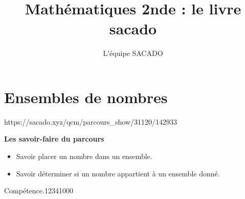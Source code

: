 



\title{Mathématiques 2nde  : le livre sacado}
\author{L'équipe SACADO}




\chapter{Ensembles de nombres}
{https://sacado.xyz/qcm/parcours_show/31120/142933}
{
 \begin{CpsCol}
	\textbf{Les savoir-faire du parcours}
 	\begin{itemize}
 		\item Savoir placer un nombre dans un ensemble.
		\item Savoir déterminer si un nombre appartient à un ensemble donné.
 	\end{itemize}
 \end{CpsCol}

\begin{His}
\end{His}

\begin{ExoDec}{Compétence.}{1234}{1}{0}{0}{0}
\end{ExoDec}
}


